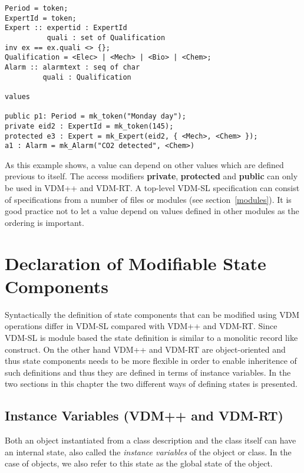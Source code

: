 \documentclass{overturerepchap}
\newcommand{\keyw}[1]{{\bf\ttfamily #1}}
\begin{document}
\begin{description}
\begin{lstlisting}
Period = token;
ExpertId = token;
Expert :: expertid : ExpertId
          quali : set of Qualification
inv ex == ex.quali <> {};
Qualification = <Elec> | <Mech> | <Bio> | <Chem>;
Alarm :: alarmtext : seq of char
         quali : Qualification

values
 
public p1: Period = mk_token("Monday day");
private eid2 : ExpertId = mk_token(145);
protected e3 : Expert = mk_Expert(eid2, { <Mech>, <Chem> });
a1 : Alarm = mk_Alarm("CO2 detected", <Chem>)
\end{lstlisting}
  As this example shows, a value can depend on other values which are
  defined previous to itself. The access modifiers \keyw{private},
  \keyw{protected} and \keyw{public} can only be used in VDM++ and VDM-RT.
  A top-level VDM-SL specification can consist of
  specifications from a number of files or modules (see
  section~\ref{modules}).  It is good practice not to let a value depend
  on values defined in other modules as the ordering is important.
\end{description}

\chapter{Declaration of Modifiable State Components}\label{chap:state}

Syntactically the definition of state components that can be modified
using VDM operations differ in VDM-SL compared with VDM++ and
VDM-RT. Since VDM-SL is module based the state definition is similar
to a monolitic record like construct. On the other hand VDM++ and
VDM-RT are object-oriented and thus state components needs to be more
flexible in order to enable inheritence of such definitions and thus
they are defined in terms of instance variables. In the two sections
in this chapter the two different ways of defining states is presented.

\section{Instance Variables (VDM++ and VDM-RT)}
\label{sec:ivars}

Both an object instantiated from a class description and the class
itself can have an internal state, also called the \emph{instance
  variables} of the object or class. In the case of objects, we also
refer to this state as the global state of the object.
\end{document}
